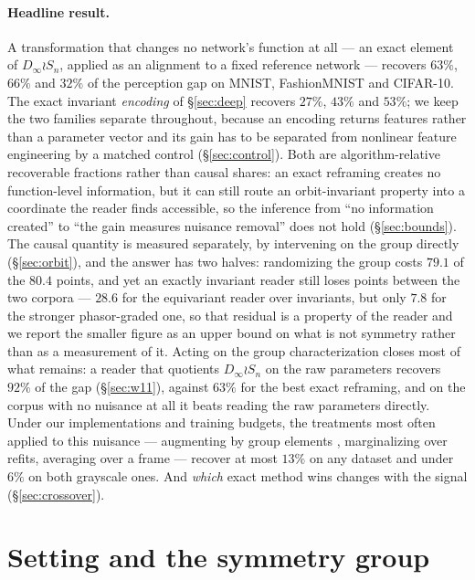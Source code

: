 \documentclass[10pt,letterpaper]{article}
\theoremstyle{definition}
\newcommand{\Dinf}{D_\infty}
\begin{document}
\paragraph{Headline result.} A transformation that changes no network's function at all --- an
exact element of $\Dinf \wr S_n$, applied as an alignment to a fixed reference network --- recovers
$63\%$, $66\%$ and $32\%$ of the perception gap on MNIST, FashionMNIST and CIFAR-10. The exact
invariant \emph{encoding} of \S\ref{sec:deep} recovers $27\%$, $43\%$ and $53\%$; we keep the two
families separate throughout, because an encoding returns features rather than a parameter vector
and its gain has to be separated from nonlinear feature engineering by a matched control
(\S\ref{sec:control}). Both are algorithm-relative recoverable fractions rather than causal shares:
an exact reframing creates no function-level information, but it can still route an orbit-invariant
property into a coordinate the reader finds accessible, so the inference from ``no information
created'' to ``the gain measures nuisance removal'' does not hold (\S\ref{sec:bounds}). The causal
quantity is measured separately, by intervening on the group directly (\S\ref{sec:orbit}), and the
answer has two halves: randomizing the group costs $79.1$ of the $80.4$ points, and yet an exactly
invariant reader still loses points between the two corpora --- $28.6$ for the equivariant reader
over invariants, but only $7.8$ for the stronger phasor-graded one, so that residual is a property
of the reader and we report the smaller figure as an upper bound on what is not symmetry rather
than as a measurement of it. Acting on the group characterization closes most of what remains: a
reader that quotients $\Dinf \wr S_n$ on the raw parameters recovers $92\%$ of the gap
(\S\ref{sec:w11}), against $63\%$ for the best exact reframing, and on the corpus with no nuisance
at all it beats reading the raw parameters directly. Under our
implementations and training budgets, the treatments most often applied to this nuisance ---
augmenting by group elements \citep{shamsian2024augmentations}, marginalizing over refits, averaging
over a frame \citep{puny2022frame} --- recover at most $13\%$ on any dataset and under $6\%$ on both
grayscale ones. And \emph{which} exact method wins changes with the signal (\S\ref{sec:crossover}).

\section{Setting and the symmetry group}\label{sec:group}
\end{document}
